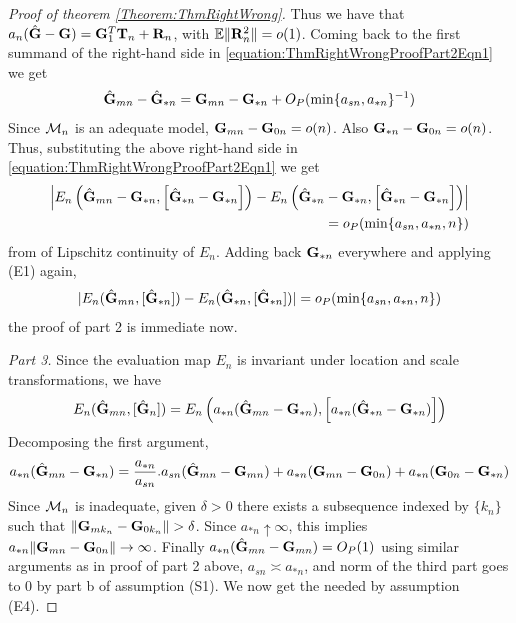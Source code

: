 \begin{proof}[Proof of theorem \ref{Theorem:ThmRightWrong}]
Thus we have that $a_n ( \hat{{\mathbf{G}}} - {\mathbf{G}} ) = {\mathbf{G}}_1^T {\mathbf{T}}_n + {\mathbf{R}}_n$, with ${\mathbb{E}} \|{\mathbf{R}}_n^2 \| = o(1)$. Coming back to the first summand of the right-hand side in \ref{equation:ThmRightWrongProofPart2Eqn1} we get
%
\begin{align}\label{equation:ThmRightWrongProofPart2Eqn2}
\hat {{\mathbf{G}}}_{m n} - \hat {{\mathbf{G}}}_{* n} = {\mathbf{G}}_{m n} - {\mathbf{G}}_{* n} + O_P(\min \{ a_{s n}, a_{* n} \}^{-1})
\end{align}
%
Since ${\cal{M}}_n$ is an adequate model, $ {\mathbf{G}}_{m n} - {\mathbf{G}}_{0 n} = o(n)$. Also $ {\mathbf{G}}_{* n} - {\mathbf{G}}_{0 n} = o(n)$. Thus, substituting the above right-hand side in \ref{equation:ThmRightWrongProofPart2Eqn1} we get
%
\begin{align}
\left| E_n \left( \hat{{\mathbf{G}}}_{mn} - {\mathbf{G}}_{* n}, \left[ \hat{{\mathbf{G}}}_{* n} - {\mathbf{G}}_{* n} \right] \right) - E_n \left( \hat{{\mathbf{G}}}_{* n} - {\mathbf{G}}_{* n}, \left[ \hat{{\mathbf{G}}}_{* n} - {\mathbf{G}}_{* n} \right] \right) \right| \notag\\
= o_P (\min \{ a_{s n}, a_{* n}, n \})
\end{align}
%
from of Lipschitz continuity of $E_n$. Adding back ${\mathbf{G}}_{* n}$ everywhere and applying (E1) again,
\begin{align}
| E_n ( \hat{{\mathbf{G}}}_{mn}, [ \hat{{\mathbf{G}}}_{* n} ] ) - E_n ( \hat{{\mathbf{G}}}_{* n}, [ \hat{{\mathbf{G}}}_{* n} ] ) | = o_P (\min \{ a_{s n}, a_{* n}, n \})
\end{align}
%
the proof of part 2 is immediate now.

{\it Part 3.} 
Since the evaluation map $E_n$ is invariant under location and scale transformations, we have
%
\begin{align}\label{equation:ThmRightWrongProofEqn1}
E_n ( \hat{{\mathbf{G}}}_{mn}, [ \hat{{\mathbf{G}}}_n]) = E_n \left( a_{* n} (\hat{{\mathbf{G}}}_{mn} - {\mathbf{G}}_{* n}), \left[ a_{* n} (\hat{{\mathbf{G}}}_{* n} - {\mathbf{G}}_{* n}) \right] \right)
\end{align}
%
Decomposing the first argument,
%
\begin{align}
a_{* n} (\hat{{\mathbf{G}}}_{mn} - {\mathbf{G}}_{* n}) = \frac{a_{* n}}{a_{s n}} . a_{s n} (\hat{{\mathbf{G}}}_{mn} - {\mathbf{G}}_{mn}) + a_{* n} ({\mathbf{G}}_{mn} - {\mathbf{G}}_{0 n}) + a_{* n} ({\mathbf{G}}_{0 n} - {\mathbf{G}}_{* n}) 
\end{align}
%
Since ${\cal{M}}_n$ is inadequate, given $\delta > 0$ there exists a subsequence indexed by $\{ k_n \}$ such that $\| {\mathbf{G}}_{mk_n} - {\mathbf{G}}_{0 k_n} \| > \delta $. Since $a_{* n} \uparrow \infty$, this implies $a_{* n} \| {\mathbf{G}}_{mn} - {\mathbf{G}}_{0 n} \| \rightarrow \infty$. Finally $ a_{* n} (\hat{{\mathbf{G}}}_{m n} - {\mathbf{G}}_{m n}) = O_P (1)$ using similar arguments as in proof of part 2 above, $a_{s n} \asymp a_{* n}$, and norm of the third part goes to 0 by part b of assumption (S1). We now get the needed by assumption (E4).
\end{proof}

